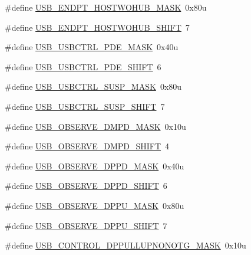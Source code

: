 \begin{DoxyCompactItemize}
\#define \hyperlink{group___u_s_b___register___masks_ga34644591d90c80611273ef5561529c34}{U\+S\+B\+\_\+\+E\+N\+D\+P\+T\+\_\+\+H\+O\+S\+T\+W\+O\+H\+U\+B\+\_\+\+M\+A\+SK}~0x80u
\item 
\#define \hyperlink{group___u_s_b___register___masks_ga3d502bcb3115f9bc7918b5fc67d42337}{U\+S\+B\+\_\+\+E\+N\+D\+P\+T\+\_\+\+H\+O\+S\+T\+W\+O\+H\+U\+B\+\_\+\+S\+H\+I\+FT}~7
\item 
\#define \hyperlink{group___u_s_b___register___masks_ga7fb8345a32022ec5df5129278d1aed30}{U\+S\+B\+\_\+\+U\+S\+B\+C\+T\+R\+L\+\_\+\+P\+D\+E\+\_\+\+M\+A\+SK}~0x40u
\item 
\#define \hyperlink{group___u_s_b___register___masks_gaaf556df66acd4f6ff2bc1f4fad1a05ed}{U\+S\+B\+\_\+\+U\+S\+B\+C\+T\+R\+L\+\_\+\+P\+D\+E\+\_\+\+S\+H\+I\+FT}~6
\item 
\#define \hyperlink{group___u_s_b___register___masks_gac65859ca12bfe997afc67545c8b1a052}{U\+S\+B\+\_\+\+U\+S\+B\+C\+T\+R\+L\+\_\+\+S\+U\+S\+P\+\_\+\+M\+A\+SK}~0x80u
\item 
\#define \hyperlink{group___u_s_b___register___masks_ga44772d68648a57e6341ceec7fd5268f3}{U\+S\+B\+\_\+\+U\+S\+B\+C\+T\+R\+L\+\_\+\+S\+U\+S\+P\+\_\+\+S\+H\+I\+FT}~7
\item 
\#define \hyperlink{group___u_s_b___register___masks_ga796850497f75cc88772d3826d1196a43}{U\+S\+B\+\_\+\+O\+B\+S\+E\+R\+V\+E\+\_\+\+D\+M\+P\+D\+\_\+\+M\+A\+SK}~0x10u
\item 
\#define \hyperlink{group___u_s_b___register___masks_ga044fcfc292ba6db33ec4e847a6510440}{U\+S\+B\+\_\+\+O\+B\+S\+E\+R\+V\+E\+\_\+\+D\+M\+P\+D\+\_\+\+S\+H\+I\+FT}~4
\item 
\#define \hyperlink{group___u_s_b___register___masks_ga8368ad607c0f5a0ab499734e26f36aad}{U\+S\+B\+\_\+\+O\+B\+S\+E\+R\+V\+E\+\_\+\+D\+P\+P\+D\+\_\+\+M\+A\+SK}~0x40u
\item 
\#define \hyperlink{group___u_s_b___register___masks_gaba84f8caae5d942588bd678bbc2ad267}{U\+S\+B\+\_\+\+O\+B\+S\+E\+R\+V\+E\+\_\+\+D\+P\+P\+D\+\_\+\+S\+H\+I\+FT}~6
\item 
\#define \hyperlink{group___u_s_b___register___masks_ga04f8b1d77478cb027a79323cef482965}{U\+S\+B\+\_\+\+O\+B\+S\+E\+R\+V\+E\+\_\+\+D\+P\+P\+U\+\_\+\+M\+A\+SK}~0x80u
\item 
\#define \hyperlink{group___u_s_b___register___masks_ga08ff5b00473fda9eb458f3457490eb15}{U\+S\+B\+\_\+\+O\+B\+S\+E\+R\+V\+E\+\_\+\+D\+P\+P\+U\+\_\+\+S\+H\+I\+FT}~7
\item 
\#define \hyperlink{group___u_s_b___register___masks_ga764d9d972859eeded5e092a77eb4de79}{U\+S\+B\+\_\+\+C\+O\+N\+T\+R\+O\+L\+\_\+\+D\+P\+P\+U\+L\+L\+U\+P\+N\+O\+N\+O\+T\+G\+\_\+\+M\+A\+SK}~0x10u

\end{DoxyCompactItemize}
